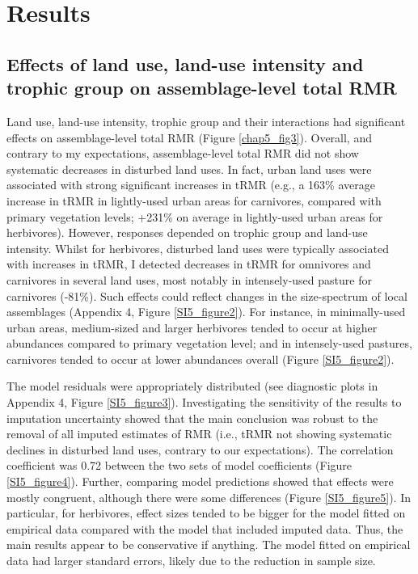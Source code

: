 

\section{Results}

\subsection{Effects of land use, land-use intensity and trophic group on assemblage-level total RMR}

Land use, land-use intensity, trophic group and their interactions had significant effects on assemblage-level total RMR (Figure \ref{chap5_fig3}). Overall, and contrary to my expectations, assemblage-level total RMR did not show systematic decreases in disturbed land uses. In fact, urban land uses were associated with strong significant increases in tRMR (e.g., a 163\% average increase in tRMR in lightly-used urban areas for carnivores, compared with primary vegetation levels; +231\% on average in lightly-used urban areas for herbivores). However, responses depended on trophic group and land-use intensity. Whilst for herbivores, disturbed land uses were typically associated with increases in tRMR, I detected decreases in tRMR for omnivores and carnivores in several land uses, most notably in intensely-used pasture for carnivores (-81\%). Such effects could reflect changes in the size-spectrum of local assemblages (Appendix 4, Figure \ref{SI5_figure2}). For instance, in minimally-used urban areas, medium-sized and larger herbivores tended to occur at higher abundances compared to primary vegetation level; and in intensely-used pastures, carnivores tended to occur at lower abundances overall (Figure \ref{SI5_figure2}).

The model residuals were appropriately distributed (see diagnostic plots in Appendix 4, Figure \ref{SI5_figure3}). Investigating the sensitivity of the results to imputation uncertainty showed that the main conclusion was robust to the removal of all imputed estimates of RMR (i.e., tRMR not showing systematic declines in disturbed land uses, contrary to our expectations). The correlation coefficient was 0.72 between the two sets of model coefficients (Figure \ref{SI5_figure4}). Further, comparing model predictions showed that effects were mostly congruent, although there were some differences (Figure \ref{SI5_figure5}). In particular, for herbivores, effect sizes tended to be bigger for the model fitted on empirical data compared with the model that included imputed data. Thus, the main results appear to be conservative if anything. The model fitted on empirical data had larger standard errors, likely due to the reduction in sample size. 


